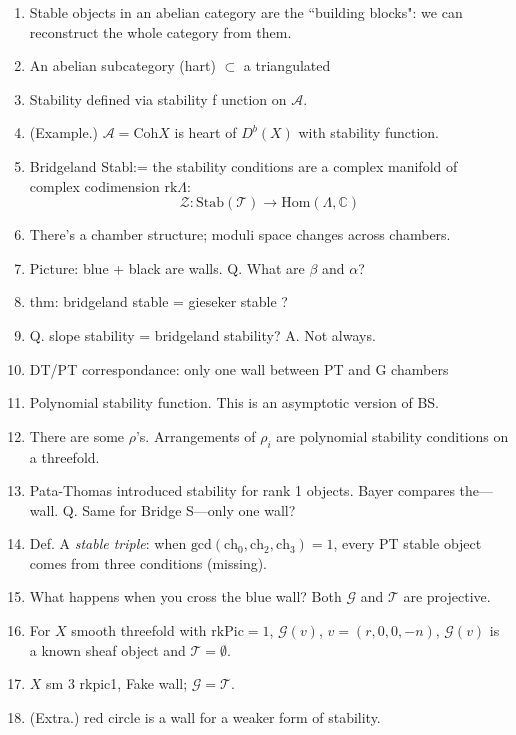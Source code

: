 \documentclass{book}
\begin{document}
\begin{enumerate}
\item Stable objects in an abelian category
are the ``building blocks":
we can reconstruct the whole category from
them.
\item  An abelian subcategory (hart)
$\subset$ a
triangulated
\item Stability defined via stability f
unction on $\mathcal{A}$.
\item (Example.) $\mathcal{A}=\text{Coh}X$ is
heart
of $D^b(X)$ with stability function.
\item Bridgeland Stabl:= the stability
conditions are a complex manifold
of complex codimension $\text{rk}\Lambda$:
$$
\mathcal{Z}:\text{Stab}(\mathcal{T})
\longrightarrow
\text{Hom}(\Lambda,\mathbb{C})
$$
\item There's a chamber structure;
moduli space changes across chambers.
\item Picture: blue + black are walls.
Q. What are $\beta$ and $\alpha$?
\item thm: bridgeland stable
= gieseker stable ?
\item Q. slope stability
= bridgeland stability?
A. Not always.
\item DT/PT correspondance:
only one wall between PT and G chambers
\medskip
\item Polynomial stability function.
This is an asymptotic version of BS.
\item There are some $\rho$'s.
Arrangements of $\rho_i$ are polynomial
stability conditions on a threefold.
\item Pata-Thomas introduced stability
for rank 1 objects.
Bayer compares the---wall. Q.
Same for Bridge S---only one wall?
\medskip
\item Def. A {\it stable triple}: when
$\text{gcd}(\text{ch}_0,\text{ch}_2,\text{ch}
_3)=1$,
every PT stable object
comes from three conditions (missing).
\item What happens when
you cross the blue wall?
Both $\mathcal{G}$ and $\mathcal{T}$ are
projective.
\medskip
\item For $X$ smooth threefold with
$\text{rk}\text{Pic}=1$, $\mathcal{G}(v)$,
$v=(r,0,0,-n)$, $\mathcal{G}(v)$ is a known
sheaf object and
$\mathcal{T}=\emptyset$.
\item $X$ sm 3 rkpic1, Fake wall;
$\mathcal{G}=\mathcal{T}$.
\item (Extra.) red circle is a wall for a
weaker form of stability.
\end{enumerate}
\end{document}
